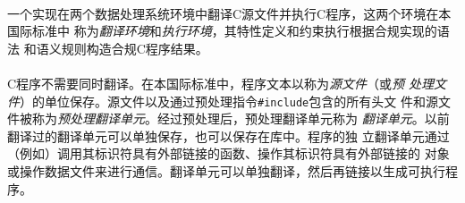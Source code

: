 
\paragraph{}
一个实现在两个数据处理系统环境中翻译C源文件并执行C程序，这两个环境在本国际标准中
称为\textit{翻译环境}和\textit{执行环境}，其特性定义和约束执行根据合规实现的语法
和语义规则构造合规C程序结果。




\paragraph{}
C程序不需要同时翻译。在本国际标准中，程序文本以称为\textit{源文件}（或\textit{预
处理文件}）的单位保存。源文件以及通过预处理指令\texttt{\#include}包含的所有头文
件和源文件被称为\textit{预处理翻译单元}。经过预处理后，预处理翻译单元称为
\textit{翻译单元}。以前翻译过的翻译单元可以单独保存，也可以保存在库中。程序的独
立翻译单元通过（例如）调用其标识符具有外部链接的函数、操作其标识符具有外部链接的
对象或操作数据文件来进行通信。翻译单元可以单独翻译，然后再链接以生成可执行程序。


